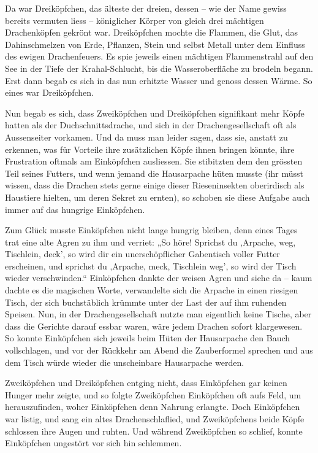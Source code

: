 \documentclass[10pt, a4paper, oneside]{book}
\begin{document}
Da war Dreiköpfchen, das älteste der dreien, dessen – wie der Name gewiss bereits vermuten liess – königlicher Körper von gleich drei mächtigen Drachenköpfen gekrönt war. Dreiköpfchen mochte die Flammen, die Glut, das Dahinschmelzen von Erde, Pflanzen, Stein und selbst Metall unter dem Einfluss des ewigen Drachenfeuers. Es spie jeweils einen mächtigen Flammenstrahl auf den See in der Tiefe der Krahal-Schlucht, bis die Wasseroberfläche zu brodeln begann. Erst dann begab es sich in das nun erhitzte Wasser und genoss dessen Wärme. So eines war Dreiköpfchen.



Nun begab es sich, dass Zweiköpfchen und Dreiköpfchen signifikant mehr Köpfe hatten als der Duchschnittsdrache, und sich in der Drachengesellschaft oft als Aussenseiter vorkamen. Und da muss man leider sagen, dass sie, anstatt zu erkennen, was für Vorteile ihre zusätzlichen Köpfe ihnen bringen könnte, ihre Frustration oftmals am Einköpfchen ausliessen. Sie stibitzten dem den grössten Teil seines Futters, und wenn jemand die Hausarpache hüten musste (ihr müsst wissen, dass die Drachen stets gerne einige dieser Rieseninsekten oberirdisch als Haustiere hielten, um deren Sekret zu ernten), so schoben sie diese Aufgabe auch immer auf das hungrige Einköpfchen.



Zum Glück musste Einköpfchen nicht lange hungrig bleiben, denn eines Tages trat eine alte Agren zu ihm und verriet: „So höre! Sprichst du ‚Arpache, weg, Tischlein, deck’, so wird dir ein unerschöpflicher Gabentisch voller Futter erscheinen, und sprichst du ‚Arpache, meck, Tischlein weg’, so wird der Tisch wieder verschwinden.“ Einköpfchen dankte der weisen Agren und siehe da – kaum dachte es die magischen Worte, verwandelte sich die Arpache in einen riesigen Tisch, der sich buchstäblich krümmte unter der Last der auf ihm ruhenden Speisen. Nun, in der Drachengesellschaft nutzte man eigentlich keine Tische, aber dass die Gerichte darauf essbar waren, wäre jedem Drachen sofort klargewesen. So konnte Einköpfchen sich jeweils beim Hüten der Hausarpache den Bauch vollschlagen, und vor der Rückkehr am Abend die Zauberformel sprechen und aus dem Tisch würde wieder die unscheinbare Hausarpache werden.



Zweiköpfchen und Dreiköpfchen entging nicht, dass Einköpfchen gar keinen Hunger mehr zeigte, und so folgte Zweiköpfchen Einköpfchen oft aufs Feld, um herauszufinden, woher Einköpfchen denn Nahrung erlangte. Doch Einköpfchen war listig, und sang ein altes Drachenschlaflied, und Zweiköpfchens beide Köpfe schlossen ihre Augen und ruhten. Und während Zweiköpfchen so schlief, konnte Einköpfchen ungestört vor sich hin schlemmen.
\end{document}
